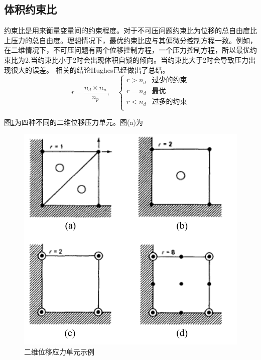 \subsection{体积约束比}
约束比是用来衡量变量间的约束程度。对于不可压问题约束比为位移的总自由度比上压力的总自由度。理想情况下，最优约束比应与其偏微分控制方程一致。例如，在二维情况下，不可压问题有两个位移控制方程，一个压力控制方程，所以最优约束比为2.当约束比小于2时会出现体积自锁的倾向。当约束比大于2时会导致压力出现很大的误差。
相关的结论Hughes已经做出了总结\cite{hughes2000}。
\begin{equation}
    r = \frac{n_d\times n_u}{n_p}, \quad 
    \begin{cases}
        r > n_d & \text{过少的约束} \\
        r = n_d & \text{最优} \\
        r < n_d & \text{过多的约束} \\
    \end{cases}
\end{equation}

图\ref{pressure_elements}为四种不同的二维位移压力单元。图(a)为
\begin{figure}[H]
    \centering 
    \includegraphics[scale=0.8]{figures/pressure_elements.png}
    \caption{二维位移应力单元示例}\label{pressure_elements}
\end{figure}


